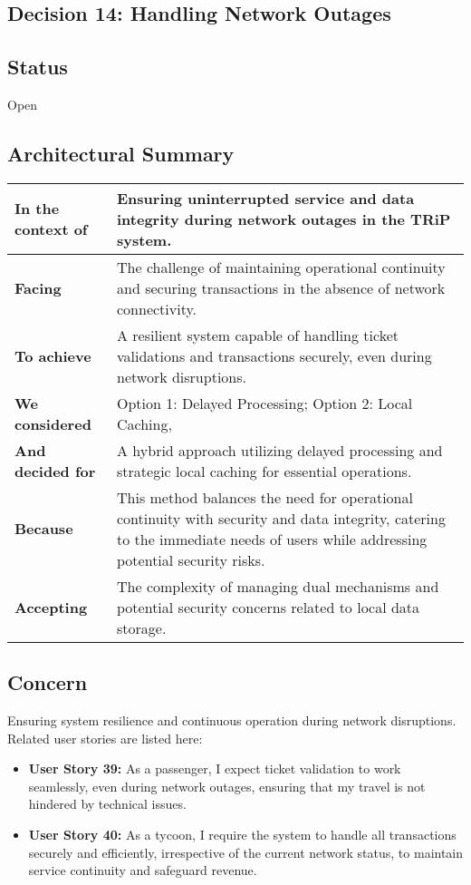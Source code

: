 \subsection{Decision 14: Handling Network Outages}

\subsection*{Status}
Open

\subsection*{Architectural Summary}
\begin{tabular}{|p{3.5cm}|p{10.5cm}|}
    \hline
    \textbf{In the context of} & Ensuring uninterrupted service and data integrity during network outages in the TRiP system. \\
    \hline
    \textbf{Facing} & The challenge of maintaining operational continuity and securing transactions in the absence of network connectivity. \\
    \hline
    \textbf{To achieve} & A resilient system capable of handling ticket validations and transactions securely, even during network disruptions. \\
    \hline
    \textbf{We considered} & Option 1: Delayed Processing; Option 2: Local Caching, \\
    \hline
    \textbf{And decided for} & A hybrid approach utilizing delayed processing and strategic local caching for essential operations. \\
    \hline
    \textbf{Because} & This method balances the need for operational continuity with security and data integrity, catering to the immediate needs of users while addressing potential security risks. \\
    \hline
    \textbf{Accepting} & The complexity of managing dual mechanisms and potential security concerns related to local data storage. \\
    \hline
\end{tabular}

\subsection*{Concern}
Ensuring system resilience and continuous operation during network disruptions.
Related user stories are listed here:
\begin{itemize}
    \item \textbf{User Story 39:} As a passenger, I expect ticket validation to work seamlessly, even during network outages, ensuring that my travel is not hindered by technical issues.
    \item \textbf{User Story 40:} As a tycoon, I require the system to handle all transactions securely and efficiently, irrespective of the current network status, to maintain service continuity and safeguard revenue. 
\end{itemize}

